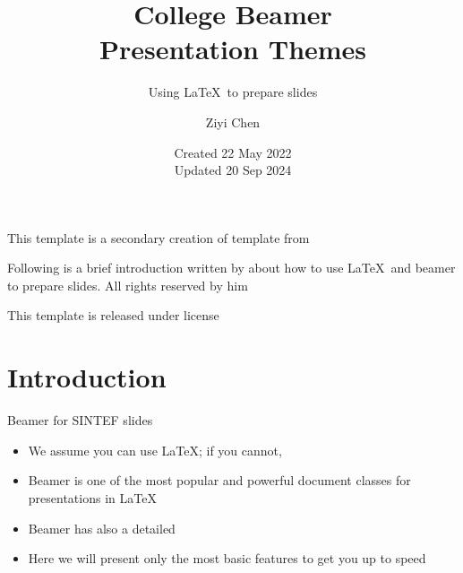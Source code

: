 \documentclass{beamer}
\title{College Beamer\\ Presentation Themes}
\subtitle{Using \LaTeX\ to prepare slides}
\author{Ziyi Chen}
\date{Created 22 May 2022\\Updated 20 Sep 2024}
\begin{document}
    \maketitle

    \begin{frame}
        This template is a secondary creation of  template from  \vspace{\baselineskip}

        Following is a brief introduction written by  about how to use \LaTeX\ and beamer to prepare slides. All rights reserved by him\vspace{\baselineskip}

        This template is released under  license
    \end{frame}

    \section{Introduction}

    \begin{frame}{Beamer for SINTEF slides}{\thesection \, \secname}
        \begin{itemize}
            \item We assume you can use \LaTeX; if you cannot, 
            \item Beamer is one of the most popular and powerful document classes for presentations in \LaTeX
            \item Beamer has also a detailed 
            \item Here we will present only the most basic features to get you up to speed
        \end{itemize}
    \end{frame}
\end{document}
